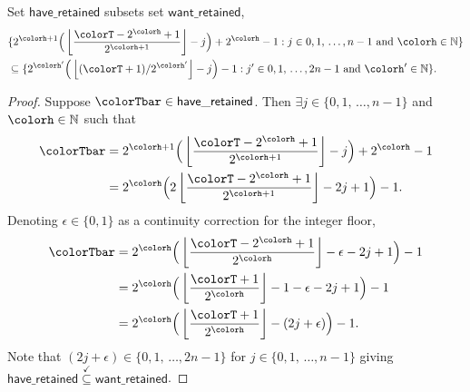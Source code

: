 \begin{sublemma}
\label{thm:tilted-rsubset}
Set $\mathsf{have\_retained}$ subsets set $\mathsf{want\_retained}$,
\begin{align*}
&\{
  2^{\colorh + 1}\Big( \left\lfloor\frac{\colorT - 2^{\colorh} + 1}{2^{\colorh + 1}} \right\rfloor - j\Big) + 2^{\colorh} - 1
  :
  j \in 0,1,\,\ldots,n-1
  \text{ and }
  \colorh \in \mathbb{N}
\}\\
&\subseteq
\{
  2^{\colorh'}\Big(\left\lfloor (\colorT + 1) / 2^{\colorh'} \right\rfloor - j\Big) - 1
  :
  j' \in 0,1,\,\ldots,2n-1
  \text{ and }
  \colorh' \in \mathbb{N}
\}.
\end{align*}
\end{sublemma}
\begin{proof}
Suppose $\colorTbar \in \mathsf{have\_retained}$.
Then $\exists j \in \{0,1,\,\ldots,n-1\}$ and $\colorh \in \mathbb{N}$ such that
\begin{align*}
\colorTbar
&= 2^{\colorh + 1}\Big(\left\lfloor \frac{\colorT - 2^{\colorh} + 1}{2^{\colorh + 1}} \right\rfloor - j \Big) + 2^{\colorh} - 1\\
&= 2^{\colorh} \Big(2\left\lfloor \frac{\colorT - 2^{\colorh} + 1}{2^{\colorh + 1}} \right\rfloor  - 2j + 1 \Big) - 1.
\end{align*}
Denoting $\epsilon \in \{0, 1\}$ as a continuity correction for the integer floor,
\begin{align*}
\colorTbar
&= 2^{\colorh} \Big( \left\lfloor \frac{\colorT - 2^{\colorh} + 1}{2^{\colorh}} \right\rfloor - \epsilon  - 2j + 1 \Big) - 1\\
&= 2^{\colorh} \Big( \left\lfloor \frac{\colorT + 1}{2^{\colorh}} \right\rfloor - 1 - \epsilon - 2j + 1 \Big) - 1\\
&= 2^{\colorh} \Big(\left\lfloor \frac{\colorT + 1}{2^{\colorh}}\right\rfloor - (2j + \epsilon) \Big) - 1.
\end{align*}
Note that $(2j + \epsilon) \in \{0,1,\,\ldots,2n-1\}$ for $j \in \{0,1,\,\ldots,n-1\}$ giving $\mathsf{have\_retained} \stackrel{\checkmark}{\subseteq} \mathsf{want\_retained}$.
\end{proof}

